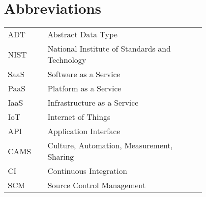 \chapter*{Abbreviations}

\begin{flushleft}
\begin{tabular}{l p{0.8\linewidth}}
ADT      & Abstract Data Type\\
NIST     & National Institute of Standards and Technology\\
SaaS     & Software as a Service\\
PaaS     & Platform as a Service\\
IaaS     & Infrastructure as a Service\\
IoT 	   & Internet of Things \\
API      & Application Interface \\
CAMS     & Culture, Automation, Measurement, Sharing \\
CI       & Continuous Integration \\
SCM      & Source Control Management
\end{tabular}
\end{flushleft}
